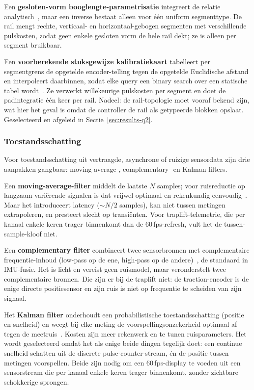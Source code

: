 \documentclass[10pt, a4paper, twocolumn]{article}
\begin{document}
Een \textbf{gesloten-vorm booglengte-parametrisatie} integreert de relatie
analytisch~\cite{strang2016calculus}, maar een inverse bestaat alleen voor één
uniform segmenttype. De rail mengt rechte, verticaal- en horizontaal-gebogen
segmenten met verschillende pulskosten, zodat geen enkele gesloten vorm de hele
rail dekt; ze is alleen per segment bruikbaar.

Een \textbf{voorberekende stuksgewijze kalibratiekaart} tabelleert per
segmentgrens de opgetelde encoder-telling tegen de opgetelde Euclidische afstand
en interpoleert daarbinnen, zodat elke query een binary search over een statische
tabel wordt~\cite{bolton2019mechatronics}. Ze verwerkt willekeurige pulskosten per
segment en doet de padintegratie één keer per rail. Nadeel: de rail-topologie moet
vooraf bekend zijn, wat hier het geval is omdat de controller de rail als
getypeerde blokken opslaat. Geselecteerd en afgeleid in
Sectie~\ref{sec:results-q2}.

\subsubsection{Toestandsschatting}
Voor toestandsschatting uit vertraagde, asynchrone of ruizige sensordata zijn
drie aanpakken gangbaar: moving-average-, complementary- en Kalman filters.

Een \textbf{moving-average-filter} middelt de laatste $N$ samples; voor
ruisreductie op langzaam variërende signalen is dat vrijwel optimaal en
rekenkundig eenvoudig~\cite{smith1997dsp}. Maar het introduceert latency
($\sim N/2$ samples), kan niet tussen metingen extrapoleren, en presteert slecht
op transiënten. Voor traplift-telemetrie, die per kanaal enkele keren trager
binnenkomt dan de 60\,fps-refresh, vult het de tussen-sample-kloof niet.

Een \textbf{complementary filter} combineert twee sensorbronnen met
complementaire frequentie-inhoud (low-pass op de ene, high-pass op de
andere)~\cite{narkhede2021cascaded}, de standaard in IMU-fusie. Het is licht en
vereist geen ruismodel, maar veronderstelt twee complementaire bronnen. Die zijn
er bij de traplift niet: de traction-encoder is de enige directe positiesensor en
zijn ruis is niet op frequentie te scheiden van zijn signaal.

Het \textbf{Kalman filter} onderhoudt een probabilistische toestandsschatting
(positie en snelheid) en weegt bij elke meting de voorspellingsonzekerheid
optimaal af tegen de meetruis~\cite{kalman1960, welch1995kalman,
bolton2019mechatronics}. Kosten zijn meer rekenwerk en te tunen ruisparameters.
Het wordt geselecteerd omdat het als enige beide dingen tegelijk doet: een
continue snelheid schatten uit de discrete pulse-counter-stream, én de positie
tussen metingen voorspellen. Beide zijn nodig om een 60\,fps-display te voeden uit
een sensorstream die per kanaal enkele keren trager binnenkomt, zonder zichtbare
schokkerige sprongen.
\end{document}
